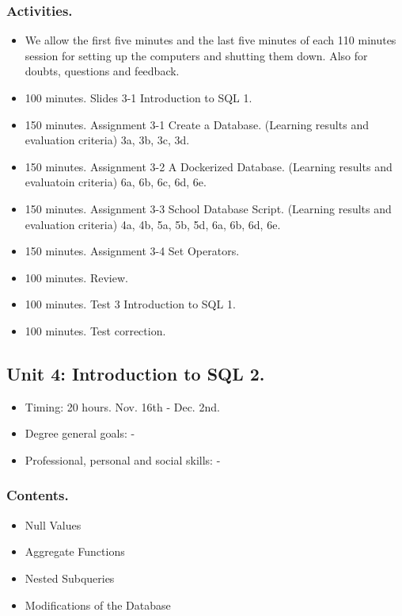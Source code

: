 \documentclass[catalan, a4paper, 12pt, titlepage]{article}
\begin{document}
  \subsubsection{Activities.}

  \begin{itemize}
          \item We allow the first five minutes and the last five minutes of each 110 minutes session for setting up the computers and shutting them down. Also for doubts, questions and feedback.
	  \item 100 minutes. Slides 3-1 Introduction to SQL 1.
	  \item 150 minutes. Assignment 3-1 Create a Database. (\faGraduationCap Learning results and evaluation criteria) 3a, 3b, 3c, 3d.
	  \item 150 minutes. Assignment 3-2 A Dockerized Database. (\faGraduationCap Learning results and evaluatoin criteria) 6a, 6b, 6c, 6d, 6e.
	  \item 150 minutes. Assignment 3-3 School Database Script. (\faGraduationCap Learning results and evaluation criteria) 4a, 4b, 5a, 5b, 5d, 6a, 6b, 6d, 6e.
	  \item 150 minutes. Assignment 3-4 Set Operators.
	  \item 100 minutes. Review.
	  \item 100 minutes. Test 3 Introduction to SQL 1.
	  \item 100 minutes. Test correction.
  \end{itemize}

  \subsection{Unit 4: Introduction to SQL 2.}

  \begin{itemize}
	\item Timing: 20 hours. Nov. 16th - Dec. 2nd.
	\item Degree general goals: -
	\item Professional, personal and social skills: -
  \end{itemize}

  \subsubsection{Contents.}
  \begin{itemize}
	  \item Null Values
	  \item Aggregate Functions 
	  \item Nested Subqueries
	  \item Modifications of the Database
  \end{itemize}
  
\end{document}
